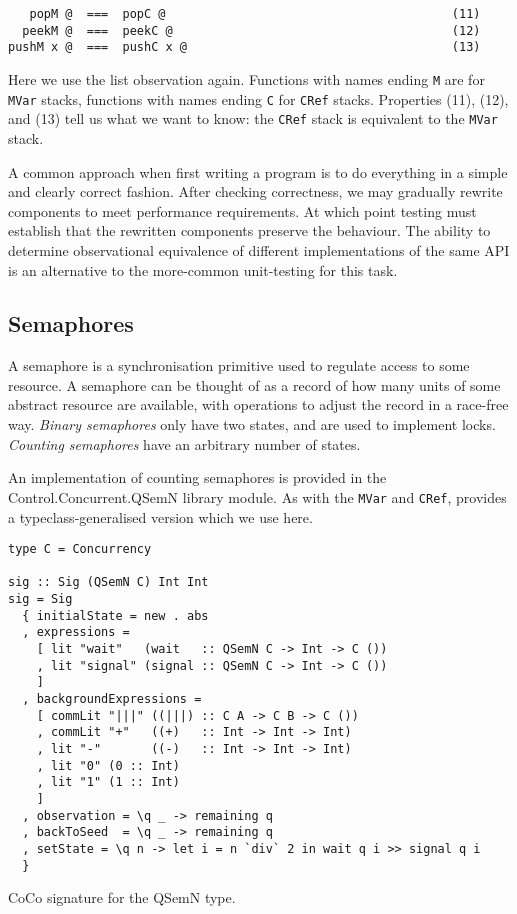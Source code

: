 \begin{verbatim}
   popM @  ===  popC @                                        (11)
  peekM @  ===  peekC @                                       (12)
pushM x @  ===  pushC x @                                     (13)
\end{verbatim}

\noindent
Here we use the list observation again.  Functions with names ending
\verb|M| are for \verb|MVar| stacks, functions with names ending
\verb|C| for \verb|CRef| stacks.  Properties (11), (12),
and (13) tell us what we want to know: the \verb|CRef| stack is
equivalent to the \verb|MVar| stack.

A common approach when first writing a program is to do everything in
a simple and clearly correct fashion.  After checking correctness, we
may gradually rewrite components to meet performance requirements.  At
which point testing must establish that the rewritten components
preserve the behaviour.  The ability to determine observational
equivalence of different implementations of the same API is an
alternative to the more-common unit-testing for this
task\cite{he1986}.

\subsection*{Semaphores}
\label{sec:coco-cases-semaphore}

A semaphore is a synchronisation primitive used to regulate access to
some resource.  A semaphore can be thought of as a record of how many
units of some abstract resource are available, with operations to
adjust the record in a race-free way.  \emph{Binary semaphores} only
have two states, and are used to implement locks. \emph{Counting
  semaphores} have an arbitrary number of states.

An implementation of counting semaphores is provided in the
Control.Concurr\-ent.QSemN library module.  As with the \verb|MVar| and
\verb|CRef|, \dejafu{} provides a typeclass-generalised version which
we use here.

\begin{listing}
\begin{verbatim}
type C = Concurrency

sig :: Sig (QSemN C) Int Int
sig = Sig
  { initialState = new . abs
  , expressions =
    [ lit "wait"   (wait   :: QSemN C -> Int -> C ())
    , lit "signal" (signal :: QSemN C -> Int -> C ())
    ]
  , backgroundExpressions =
    [ commLit "|||" ((|||) :: C A -> C B -> C ())
    , commLit "+"   ((+)   :: Int -> Int -> Int)
    , lit "-"       ((-)   :: Int -> Int -> Int)
    , lit "0" (0 :: Int)
    , lit "1" (1 :: Int)
    ]
  , observation = \q _ -> remaining q
  , backToSeed  = \q _ -> remaining q
  , setState = \q n -> let i = n `div` 2 in wait q i >> signal q i
  }
\end{verbatim}
\caption{CoCo signature for the QSemN type.}
\label{lst:sig}
\end{listing}

